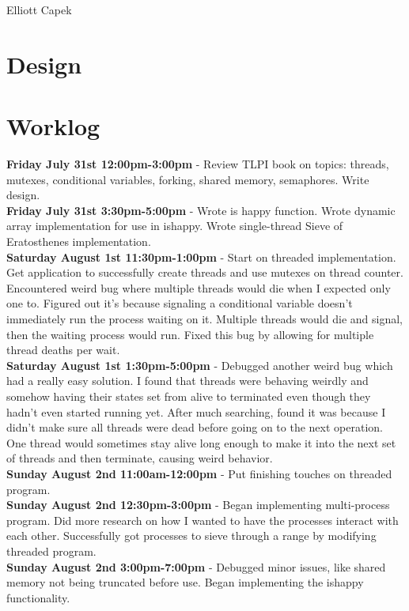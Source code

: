 \documentclass[11pt]{article}
\begin{document}
Elliott Capek \\

\section{Design}



\section{Worklog}
\textbf{Friday July 31st 12:00pm-3:00pm} - Review TLPI book on topics: threads, mutexes, conditional variables, forking, shared memory, semaphores. Write design.\\
\textbf{Friday July 31st 3:30pm-5:00pm} - Wrote is happy function. Wrote dynamic array implementation for use in ishappy. Wrote single-thread Sieve of Eratosthenes implementation. \\
\textbf{Saturday August 1st 11:30pm-1:00pm} - Start on threaded implementation. Get application to successfully create threads and use mutexes on thread counter. Encountered weird bug where multiple threads would die when I expected only one to. Figured out it's because signaling a conditional variable doesn't immediately run the process waiting on it. Multiple threads would die and signal, then the waiting process would run. Fixed this bug by allowing for multiple thread deaths per wait.\\
\textbf{Saturday August 1st 1:30pm-5:00pm} - Debugged another weird bug which had a really easy solution. I found that threads were behaving weirdly and somehow having their states set from alive to terminated even though they hadn't even started running yet. After much searching, found it was because I didn't make sure all threads were dead before going on to the next operation. One thread would sometimes stay alive long enough to make it into the next set of threads and then terminate, causing weird behavior. \\
\textbf{Sunday August 2nd 11:00am-12:00pm} - Put finishing touches on threaded program. \\
\textbf{Sunday August 2nd 12:30pm-3:00pm} - Began implementing multi-process program. Did more research on how I wanted to have the processes interact with each other. Successfully got processes to sieve through a range by modifying threaded program.\\
\textbf{Sunday August 2nd 3:00pm-7:00pm} - Debugged minor issues, like shared memory not being truncated before use. Began implementing the ishappy functionality. \\
\end{document}
